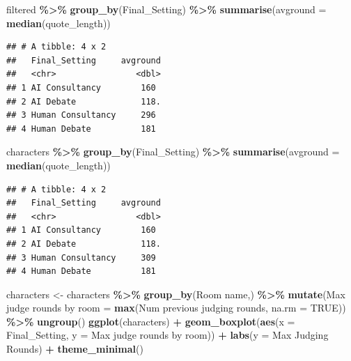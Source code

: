 \documentclass[
]{article}
\newenvironment{Shaded}{\begin{snugshade}}{\end{snugshade}}
\newcommand{\AttributeTok}[1]{\textcolor[rgb]{0.13,0.29,0.53}{#1}}
\newcommand{\ConstantTok}[1]{\textcolor[rgb]{0.56,0.35,0.01}{#1}}
\newcommand{\FunctionTok}[1]{\textcolor[rgb]{0.13,0.29,0.53}{\textbf{#1}}}
\newcommand{\NormalTok}[1]{#1}
\newcommand{\OtherTok}[1]{\textcolor[rgb]{0.56,0.35,0.01}{#1}}
\newcommand{\SpecialCharTok}[1]{\textcolor[rgb]{0.81,0.36,0.00}{\textbf{#1}}}
\newcommand{\StringTok}[1]{\textcolor[rgb]{0.31,0.60,0.02}{#1}}
\begin{document}
\begin{Shaded}
\begin{Highlighting}[]
\NormalTok{filtered }\SpecialCharTok{\%\textgreater{}\%} \FunctionTok{group\_by}\NormalTok{(Final\_Setting) }\SpecialCharTok{\%\textgreater{}\%} \FunctionTok{summarise}\NormalTok{(}\AttributeTok{avground =} \FunctionTok{median}\NormalTok{(quote\_length))}
\end{Highlighting}
\end{Shaded}

\begin{verbatim}
## # A tibble: 4 x 2
##   Final_Setting     avground
##   <chr>                <dbl>
## 1 AI Consultancy        160 
## 2 AI Debate             118.
## 3 Human Consultancy     296 
## 4 Human Debate          181
\end{verbatim}

\begin{Shaded}
\begin{Highlighting}[]
\NormalTok{characters }\SpecialCharTok{\%\textgreater{}\%} \FunctionTok{group\_by}\NormalTok{(Final\_Setting) }\SpecialCharTok{\%\textgreater{}\%} \FunctionTok{summarise}\NormalTok{(}\AttributeTok{avground =} \FunctionTok{median}\NormalTok{(quote\_length))}
\end{Highlighting}
\end{Shaded}

\begin{verbatim}
## # A tibble: 4 x 2
##   Final_Setting     avground
##   <chr>                <dbl>
## 1 AI Consultancy        160 
## 2 AI Debate             118.
## 3 Human Consultancy     309 
## 4 Human Debate          181
\end{verbatim}

\begin{Shaded}
\begin{Highlighting}[]
\NormalTok{characters }\OtherTok{\textless{}{-}}\NormalTok{ characters }\SpecialCharTok{\%\textgreater{}\%}
  \FunctionTok{group\_by}\NormalTok{(}\StringTok{\textasciigrave{}}\AttributeTok{Room name}\StringTok{\textasciigrave{}}\NormalTok{,) }\SpecialCharTok{\%\textgreater{}\%}
  \FunctionTok{mutate}\NormalTok{(}\StringTok{\textasciigrave{}}\AttributeTok{Max judge rounds by room}\StringTok{\textasciigrave{}} \OtherTok{=} \FunctionTok{max}\NormalTok{(}\StringTok{\textasciigrave{}}\AttributeTok{Num previous judging rounds}\StringTok{\textasciigrave{}}\NormalTok{, }\AttributeTok{na.rm =} \ConstantTok{TRUE}\NormalTok{)) }\SpecialCharTok{\%\textgreater{}\%}
  \FunctionTok{ungroup}\NormalTok{()}
\FunctionTok{ggplot}\NormalTok{(characters) }\SpecialCharTok{+}
  \FunctionTok{geom\_boxplot}\NormalTok{(}\FunctionTok{aes}\NormalTok{(}\AttributeTok{x =}\NormalTok{ Final\_Setting, }\AttributeTok{y =} \StringTok{\textasciigrave{}}\AttributeTok{Max judge rounds by room}\StringTok{\textasciigrave{}}\NormalTok{)) }\SpecialCharTok{+}
  \FunctionTok{labs}\NormalTok{(}\AttributeTok{y =} \StringTok{\textquotesingle{}Max Judging Rounds\textquotesingle{}}\NormalTok{) }\SpecialCharTok{+}
  \FunctionTok{theme\_minimal}\NormalTok{() }
\end{Highlighting}
\end{Shaded}
\end{document}
